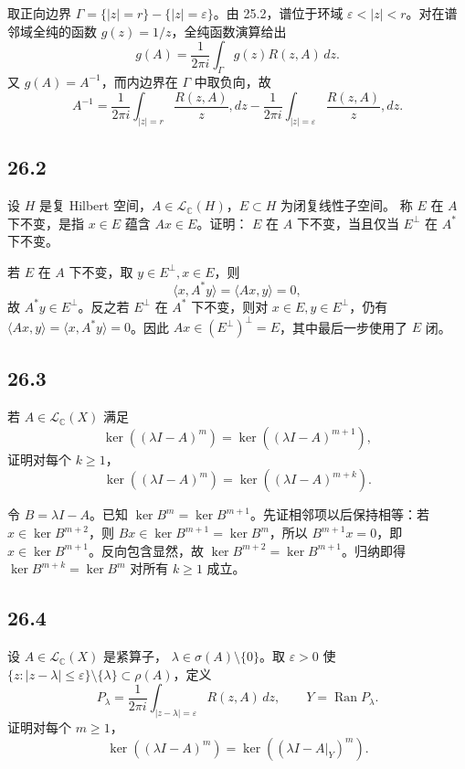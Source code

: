 取正向边界 $\Gamma=\{|z|=r\}-\{|z|=\varepsilon\}$。由 25.2，谱位于环域
$\varepsilon<|z|<r$。对在谱邻域全纯的函数 $g(z)=1/z$，全纯函数演算给出
\[
 g(A)=\frac1{2\pi i}\int_\Gamma g(z)R(z,A)\,dz.
\]
又 $g(A)=A^{-1}$，而内边界在 $\Gamma$ 中取负向，故
\[
 A^{-1}=\frac1{2\pi i}\int_{|z|=r}\frac{R(z,A)}z,dz
 -\frac1{2\pi i}\int_{|z|=\varepsilon}\frac{R(z,A)}z,dz.
\]

\subsection*{26.2}
\begin{problem}
设 $H$ 是复 Hilbert 空间，$A\in\mathcal L_{\mathbb C}(H)$，$E\subset H$ 为闭复线性子空间。
称 $E$ 在 $A$ 下不变，是指 $x\in E$ 蕴含 $Ax\in E$。证明：
$E$ 在 $A$ 下不变，当且仅当 $E^\perp$ 在 $A^*$ 下不变。
\end{problem}

若 $E$ 在 $A$ 下不变，取 $y\in E^\perp,x\in E$，则
\[
 \langle x,A^*y\rangle=\langle Ax,y\rangle=0,
\]
故 $A^*y\in E^\perp$。反之若 $E^\perp$ 在 $A^*$ 下不变，则对
$x\in E,y\in E^\perp$，仍有
$\langle Ax,y\rangle=\langle x,A^*y\rangle=0$。因此
$Ax\in(E^\perp)^\perp=E$，其中最后一步使用了 $E$ 闭。

\subsection*{26.3}
\begin{problem}
若 $A\in\mathcal L_{\mathbb C}(X)$ 满足
\[
 \ker((\lambda I-A)^m)=\ker((\lambda I-A)^{m+1}),
\]
证明对每个 $k\geq1$，
\[
 \ker((\lambda I-A)^m)=\ker((\lambda I-A)^{m+k}).
\]
\end{problem}

令 $B=\lambda I-A$。已知 $\ker B^m=\ker B^{m+1}$。先证相邻项以后保持相等：若
$x\in\ker B^{m+2}$，则 $Bx\in\ker B^{m+1}=\ker B^m$，所以
$B^{m+1}x=0$，即 $x\in\ker B^{m+1}$。反向包含显然，故
$\ker B^{m+2}=\ker B^{m+1}$。归纳即得
$\ker B^{m+k}=\ker B^m$ 对所有 $k\geq1$ 成立。

\subsection*{26.4}
\begin{problem}
设 $A\in\mathcal L_{\mathbb C}(X)$ 是紧算子，
$\lambda\in\sigma(A)\setminus\{0\}$。取 $\varepsilon>0$ 使
$\{z:|z-\lambda|\leq\varepsilon\}\setminus\{\lambda\}\subset\rho(A)$，定义
\[
 P_\lambda=\frac1{2\pi i}\int_{|z-\lambda|=\varepsilon}R(z,A)\,dz,
 \qquad Y=\operatorname{Ran}P_\lambda.
\]
证明对每个 $m\geq1$，
\[
 \ker((\lambda I-A)^m)=\ker((\lambda I-A|_Y)^m).
\]
\end{problem}

